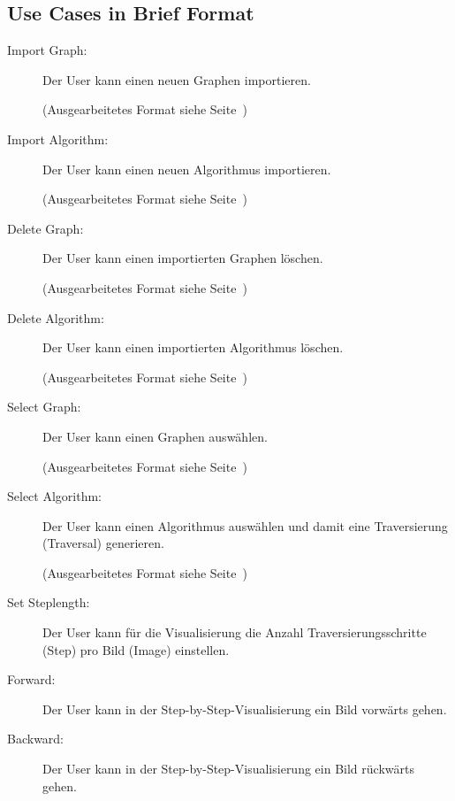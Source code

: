 \subsection{Use Cases in Brief Format}
\label{subsec:Use Cases in Brief Format}
\begin{description}
  \item[Import Graph:] Der User kann einen neuen Graphen importieren.

  (Ausgearbeitetes Format siehe Seite~\pageref{uc:Import Graph})

  \item[Import \Gls{Algorithm}:] Der User kann einen neuen Algorithmus importieren.

  (Ausgearbeitetes Format siehe Seite~\pageref{uc:Import Algorithm})

  \item[Delete Graph:] Der User kann einen importierten Graphen l\"oschen.

  (Ausgearbeitetes Format siehe Seite~\pageref{uc:Delete Graph})

  \item[Delete Algorithm:] Der User kann einen importierten Algorithmus l\"oschen.

  (Ausgearbeitetes Format siehe Seite~\pageref{uc:Delete Algorithm})

  \item[Select Graph:] Der User kann einen Graphen ausw\"ahlen.

  (Ausgearbeitetes Format siehe Seite~\pageref{uc:Select Graph})

  \item[Select Algorithm:] Der User kann einen Algorithmus ausw\"ahlen und damit eine Traversierung (\Gls{Traversal}) generieren.

  (Ausgearbeitetes Format siehe Seite~\pageref{uc:Select Algorithm})

  \item[Set \Gls{Steplength}:] Der User kann f\"ur die Visualisierung die Anzahl Traversierungsschritte (\Gls{Step}) pro Bild (\Gls{Image}) einstellen.

  \item[Forward:] Der User kann in der \Gls{Step-by-Step}-Visualisierung ein Bild vorw\"arts gehen.

  \item[Backward:] Der User kann in der Step-by-Step-Visualisierung ein Bild r\"uckw\"arts gehen.


\end{description}
